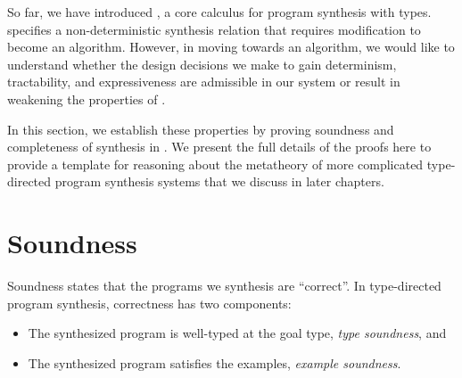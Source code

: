 So far, we have introduced \lsyn{}, a core calculus for program synthesis with types.
\lsyn{} specifies a non-deterministic synthesis relation that requires modification to become an algorithm.
However, in moving towards an algorithm, we would like to understand whether the design decisions we make to gain determinism, tractability, and expressiveness are admissible in our system or result in weakening the properties of \lsyn{}.

In this section, we establish these properties by proving soundness and completeness of synthesis in \lsyn{}.
We present the full details of the proofs here to provide a template for reasoning about the metatheory of  more complicated type-directed program synthesis systems that we discuss in later chapters.

\section{Soundness}

Soundness states that the programs we synthesis are ``correct''.
In type-directed program synthesis, correctness has two components:
\begin{itemize}
  \item The synthesized program is well-typed at the goal type, \emph{type soundness}, and
  \item The synthesized program satisfies the examples, \emph{example soundness}.
\end{itemize}

